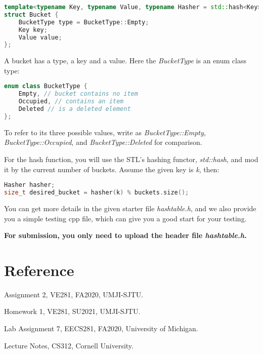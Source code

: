 \documentclass[11pt]{exam}
\begin{document}
\begin{lstlisting}[language=c++]
template<typename Key, typename Value, typename Hasher = std::hash<Key>>
struct Bucket {
	BucketType type = BucketType::Empty;
	Key key;
	Value value;
};
\end{lstlisting}

A bucket has a type, a key and a value. Here the \textit{BucketType} is an enum class type:
\begin{lstlisting}[language=c++]
enum class BucketType {
	Empty, // bucket contains no item
	Occupied, // contains an item
	Deleted // is a deleted element
};
\end{lstlisting}

To refer to its three possible values, write as \textit{BucketType::Empty, BucketType::Occupied}, and \textit{BucketType::Deleted} for comparison.

For the hash function, you will use the STL's hashing functor, \textit{std::hash}, and mod it by the current number of buckets. Assume the given key is \textit{k}, then:
\begin{lstlisting}[language=c++]
Hasher hasher;
size_t desired_bucket = hasher(k) % buckets.size();
\end{lstlisting}

You can get more details in the given starter file \textit{hashtable.h}, and we also provide you a simple testing cpp file, which can give you a good start for your testing.

\textbf{For submission, you only need to upload the header file \textit{hashtable.h}.}


\section*{Reference}
Assignment 2, VE281, FA2020, UMJI-SJTU.

Homework 1, VE281, SU2021, UMJI-SJTU.

Lab Assignment 7, EECS281, FA2020, University of Michigan.

Lecture Notes, CS312, Cornell University.
\end{document}

